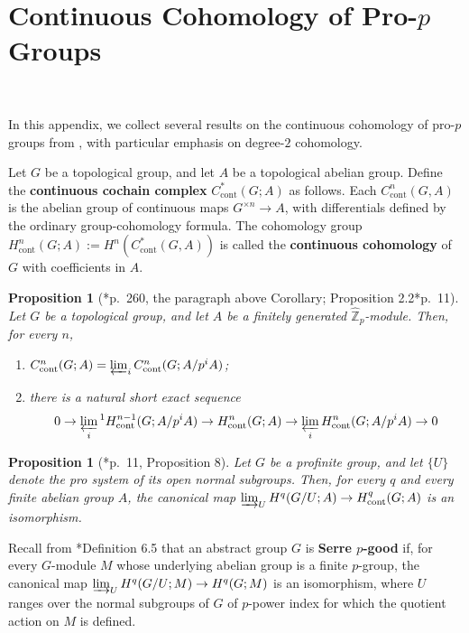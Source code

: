 \documentclass[11pt]{amsart}
\newtheorem{proposition}[theorem]{Proposition}
\theoremstyle{definition}
\numberwithin{equation}{section}
\numberwithin{equation}{section}
\newcommand\ZZ{\mathbb{Z}}
\DeclareMathOperator{\cont}{cont}
\begin{document}
\section{Continuous Cohomology of Pro-$p$ Groups}\label{Section: continuous cohomology}\,

In this appendix, we collect several results on the continuous cohomology of pro-$p$ groups from \cite{Serre-Galois-cohomology}\cite{Tate-continuous-group-cohomology}, with particular emphasis on degree-$2$ cohomology. 

Let $G$ be a topological group, and let $A$ be a topological abelian group. Define the \textbf{continuous cochain complex} $C^*_{\cont}(G;A)$ as follows. Each $C^n_{\cont}(G,A)$ is the abelian group of continuous maps $G^{\times n}\rightarrow A$, with differentials defined by the ordinary group-cohomology formula. The cohomology group $H^n_{\cont}(G;A):=H^n(C^*_{\cont}(G,A))$ is called the \textbf{continuous cohomology} of $G$ with coefficients in $A$.

\begin{proposition}[\cite{Tate-continuous-group-cohomology}*{p.~260, the paragraph above Corollary; Proposition 2.2}\cite{Serre-Galois-cohomology}*{p.~11}]\label{Fact: Milnor exact sequence for continuous cohomology}
Let $G$ be a topological group, and let $A$ be a finitely generated $\widehat{\ZZ}_p$-module. Then, for every $n$,
\begin{enumerate}[leftmargin=0.25in]
    \item $C^n_{\cont}(G;A)=\varprojlim_i C^n_{\cont}(G;A/p^iA)$;
    \item there is a natural short exact sequence
    \[
    0\rightarrow \varprojlim_i{}^1H^{n-1}_{\cont}(G;A/p^iA)\rightarrow H_{\cont}^{n}(G;A)\rightarrow \varprojlim_i H^{n}_{\cont}(G;A/p^iA) \rightarrow 0
    \]
\end{enumerate}
\end{proposition}

\begin{proposition}[\cite{Serre-Galois-cohomology}*{p.~11, Proposition 8}]\label{Fact: relation between continuous cohomology and usual cohomology for the system}
Let $G$ be a profinite group, and let $\{U\}$ denote the pro system of its open normal subgroups. Then, for every $q$ and every finite abelian group $A$, the canonical map $\varinjlim_U H^q(G/U;A)\rightarrow H^q_{\cont}(G;A)$ is an isomorphism.
\end{proposition} 

Recall from \cite{Serre-Galois-cohomology}\cite{Artin-Mazur-etale-homotopy}*{Definition 6.5} that an abstract group $G$ is \textbf{Serre $p$-good} if, for every $G$-module $M$ whose underlying abelian group is a finite $p$-group, the canonical map
$\varinjlim_U H^q(G/U;M)\rightarrow H^q(G;M)$ is an isomorphism, where $U$ ranges over the normal subgroups of $G$ of $p$-power index for which the quotient action on $M$ is defined.
\end{document}
